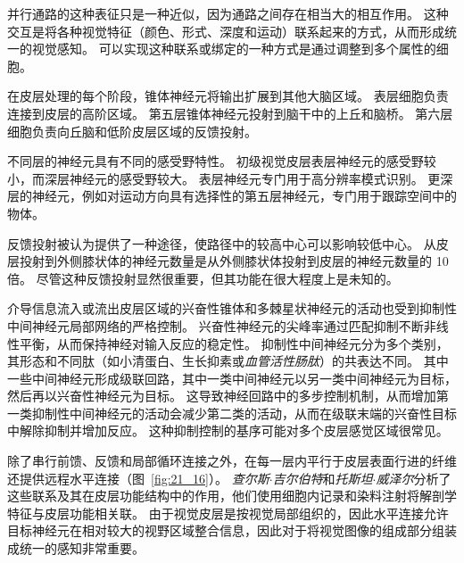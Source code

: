 并行通路的这种表征只是一种近似，因为通路之间存在相当大的相互作用。
这种交互是将各种视觉特征（颜色、形式、深度和运动）联系起来的方式，从而形成统一的视觉感知。
可以实现这种联系或绑定的一种方式是通过调整到多个属性的细胞。


在皮层处理的每个阶段，锥体神经元将输出扩展到其他大脑区域。
表层细胞负责连接到皮层的高阶区域。
第五层锥体神经元投射到脑干中的上丘和脑桥。
第六层细胞负责向丘脑和低阶皮层区域的反馈投射。


不同层的神经元具有不同的感受野特性。
初级视觉皮层表层神经元的感受野较小，而深层神经元的感受野较大。
表层神经元专门用于高分辨率模式识别。 
更深层的神经元，例如对运动方向具有选择性的第五层神经元，专门用于跟踪空间中的物体。


反馈投射被认为提供了一种途径，使路径中的较高中心可以影响较低中心。
从皮层投射到外侧膝状体的神经元数量是从外侧膝状体投射到皮层的神经元数量的 10 倍。
尽管这种反馈投射显然很重要，但其功能在很大程度上是未知的。


介导信息流入或流出皮层区域的兴奋性锥体和多棘星状神经元的活动也受到抑制性中间神经元局部网络的严格控制。
兴奋性神经元的尖峰率通过匹配抑制不断非线性平衡，从而保持神经对输入反应的稳定性。
抑制性中间神经元分为多个类别，其形态和不同肽（如小清蛋白、生长抑素或\textit{血管活性肠肽}）的共表达不同。
其中一些中间神经元形成级联回路，其中一类中间神经元以另一类中间神经元为目标，然后再以兴奋性神经元为目标。
这导致神经回路中的多步控制机制，从而增加第一类抑制性中间神经元的活动会减少第二类的活动，从而在级联末端的兴奋性目标中解除抑制并增加反应。
这种抑制控制的基序可能对多个皮层感觉区域很常见。


除了串行前馈、反馈和局部循环连接之外，在每一层内平行于皮层表面行进的纤维还提供远程水平连接（图~\ref{fig:21_16}）。
\textit{查尔斯$\cdot$吉尔伯特}和\textit{托斯坦$\cdot$威泽尔}分析了这些联系及其在皮层功能结构中的作用，他们使用细胞内记录和染料注射将解剖学特征与皮层功能相关联。
由于视觉皮层是按视觉局部组织的，因此水平连接允许目标神经元在相对较大的视野区域整合信息，因此对于将视觉图像的组成部分组装成统一的感知非常重要。


